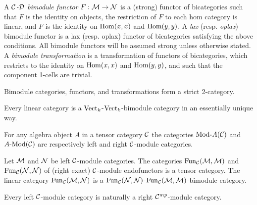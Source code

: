 \documentclass{amsart}
\begin{document}
\begin{definition}		
A {\em $\mathcal C$-$\mathcal D$ bimodule functor} $F:\mathcal M \to \mathcal N$ is a (strong) functor of bicategories such that 
		 $F$ is the identity on objects,
		  the restriction of $F$ to each hom category is linear,
		 and $F$ is the identity on $\operatorname{Hom}(x,x)$ and $\operatorname{Hom}(y,y)$.
A {\em lax} (resp. {\em oplax}) bimodule functor is a lax (resp. oplax) functor of bicategories satisfying the above conditions. All bimodule functors will be assumed strong unless otherwise stated. 
	A {\em bimodule transformation} is a transformation of functors of bicategories, which restricts to the identity on $\operatorname{Hom}(x,x)$ and $\operatorname{Hom}(y,y)$, and such that the component 1-cells are trivial.  
\end{definition}
	
%
Bimodule categories, functors, and transformations form a strict 2-category.

\begin{example}
	Every linear category is a $\mathrm{Vect}_k$-$\mathrm{Vect}_k$-bimodule category in an essentially unique way. 
\end{example}

\begin{example}
	For any algebra object $A$ in a tensor category $\mathcal C$ the categories $\Mod{}{A}(\cC)$ and $\Mod{A}{}(\cC)$ are respectively left and right $\mathcal C$-module categories. 
\end{example}

\begin{example}
	Let $\mathcal M$ and $\mathcal N$ be left $\mathcal C$-module categories. The categories $\operatorname{Fun}_{\mathcal C}(\mathcal M, \mathcal M)$ and $\operatorname{Fun}_{\mathcal C}(\mathcal N, \mathcal N)$ of (right exact) $\mathcal C$-module endofunctors is a tensor category. The linear category $\operatorname{Fun}_{\mathcal C}(\mathcal M, \mathcal N)$ is a $\operatorname{Fun}_{\mathcal C}(\mathcal N, \mathcal N)$-$\operatorname{Fun}_{\mathcal C}(\mathcal M, \mathcal M)$-bimodule category. 
\end{example}

\begin{remark}
 	Every left $\mathcal C$-module category is naturally a right $\mathcal C^{mp}$-module category. 
\end{remark}
\end{document}
